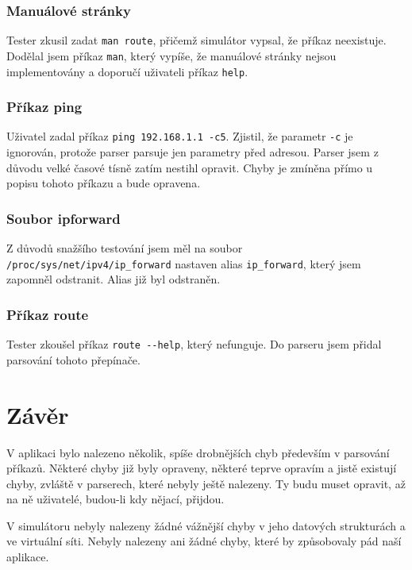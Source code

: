 \subsubsection{Manuálové stránky}

Tester zkusil zadat \verb|man route|, přičemž simulátor vypsal, že příkaz neexistuje. Dodělal jsem příkaz \verb|man|, který vypíše, že manuálové stránky nejsou implementovány a doporučí uživateli příkaz \verb|help|.

\subsubsection{Příkaz ping}

Uživatel zadal příkaz \verb|ping 192.168.1.1 -c5|. Zjistil, že parametr \verb|-c| je ignorován, protože parser parsuje jen parametry před adresou. Parser jsem z důvodu velké časové tísně zatím nestihl opravit. Chyby je zmíněna přímo u popisu tohoto příkazu a bude opravena.

\subsubsection{Soubor ipforward}

Z důvodů snažšího testování jsem měl na soubor \verb|/proc/sys/net/ipv4/ip_forward| nastaven alias \verb|ip_forward|, který jsem zapomněl odstranit. Alias již byl odstraněn.

\subsubsection{Příkaz route}

Tester zkoušel příkaz \verb|route --help|, který nefunguje. Do parseru jsem přidal parsování tohoto přepínače.




\section{Závěr}

V aplikaci bylo nalezeno několik, spíše drobnějších chyb především v parsování příkazů. Některé chyby již byly opraveny, některé teprve opravím a jistě existují chyby, zvláště v parserech, které nebyly ještě nalezeny. Ty budu muset opravit, až na ně uživatelé, budou-li kdy nějací, přijdou.

V simulátoru nebyly nalezeny žádné vážnější chyby v jeho datových strukturách a ve virtuální síti. Nebyly nalezeny ani žádné chyby, které by způsobovaly pád naší aplikace.
